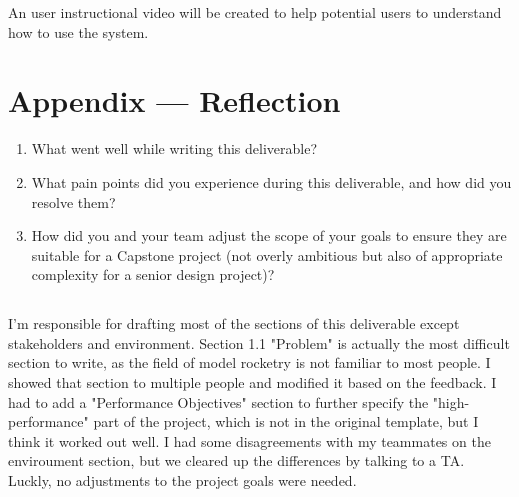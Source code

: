 \documentclass{article}
\begin{document}
An user instructional video will be created to help potential users to
understand how to use the system.

\newpage{}

\section*{Appendix --- Reflection}




\begin{enumerate}
  \item What went well while writing this deliverable?
  \item What pain points did you experience during this deliverable, and how did you
        resolve them?
  \item How did you and your team adjust the scope of your goals to ensure they are
        suitable for a Capstone project (not overly ambitious but also of appropriate
        complexity for a senior design project)?
\end{enumerate}

\subsection*{\color{blue}{Jianqing Liu}}

I'm responsible for drafting most of the sections of this deliverable except
stakeholders and environment. Section 1.1 "Problem" is actually the most
difficult section to write, as the field of model rocketry is not familiar to
most people. I showed that section to multiple people and modified it based on
the feedback. I had to add a "Performance Objectives" section to further
specify the "high-performance" part of the project, which is not in the
original template, but I think it worked out well. I had some disagreements
with my teammates on the enviroument section, but we cleared up the differences
by talking to a TA. Luckly, no adjustments to the project goals were needed.
\end{document}
